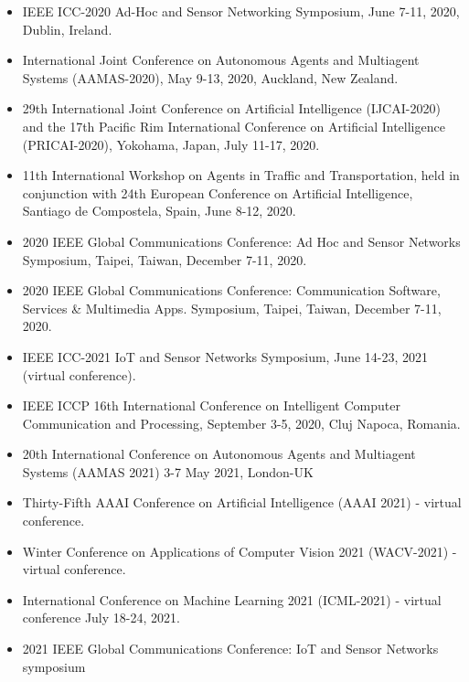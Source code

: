 \begin{itemize}
\item IEEE ICC-2020 Ad-Hoc and Sensor Networking Symposium, June 7-11, 2020, Dublin, Ireland.

\item International Joint Conference on Autonomous Agents and Multiagent Systems (AAMAS-2020), May 9-13, 2020, Auckland, New Zealand.

\item  29th International Joint Conference on Artificial Intelligence (IJCAI-2020) and the 17th Pacific Rim International Conference on Artificial Intelligence (PRICAI-2020),  Yokohama, Japan, July 11-17, 2020.

\item 11th International Workshop on Agents in Traffic and Transportation, held in conjunction with 24th European Conference on Artificial Intelligence, Santiago de Compostela, Spain, June 8-12, 2020.

\item 2020 IEEE Global Communications Conference: Ad Hoc and Sensor Networks Symposium, Taipei, Taiwan, December 7-11, 2020.

\item 2020 IEEE Global Communications Conference: Communication Software, Services \& Multimedia Apps. Symposium, Taipei, Taiwan, December 7-11, 2020.

\item IEEE ICC-2021 IoT and Sensor Networks Symposium, June 14-23, 2021 (virtual conference).

\item IEEE ICCP 16th International Conference on Intelligent Computer Communication and Processing, September 3-5, 2020, Cluj Napoca, Romania.

\item 20th International Conference on Autonomous Agents and Multiagent Systems (AAMAS 2021) 3-7 May 2021, London-UK

\item Thirty-Fifth AAAI Conference on Artificial Intelligence (AAAI 2021) - virtual conference.

\item Winter Conference on Applications of Computer Vision 2021 (WACV-2021) - virtual conference.

\item International Conference on Machine Learning 2021 (ICML-2021) - virtual conference July 18-24, 2021.

\item 2021 IEEE Global Communications Conference: IoT and Sensor Networks symposium


\end{itemize}
